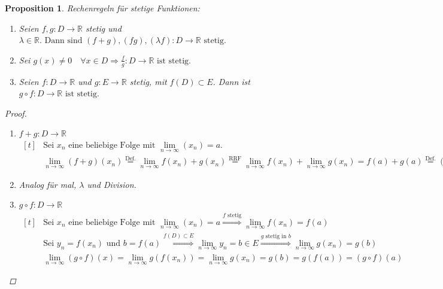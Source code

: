 \documentclass[a4paper,titlepage,oneside]{article}
\def\R{\ensuremath{\mathbb{R}} }
\def\sp{\hspace{0,1cm}}
\renewcommand{\liminf}[2][n]{\ensuremath{\lim\limits_{#1 \rightarrow \infty}{#2}}}
\theoremstyle{thmstyle}
\newtheorem{prop}[satz]{Proposition}
\theoremstyle{subthmstyle}
\begin{document}
\begin{prop}
Rechenregeln für stetige Funktionen:
\begin{enumerate}
\item Seien  $f, g : D \to \R$ stetig und $\lambda \in \R. \text{ Dann sind } (f+g),(fg),(\lambda f) : D \to \R \text{ stetig.}$
\item Sei $\displaystyle g(x) \ne 0 \quad \forall x \in D \Rightarrow \frac{f}{g}: D \to \R \text{ ist stetig.}$
\item Seien \(f: D \to \R\) und \(g:E \to \R\) stetig, mit \(f(D) \subset E\). Dann ist $ g \circ f : D \to \R \text{ ist stetig.}$
\end{enumerate}

\begin{proof}\sp
\begin{enumerate}
\item \(f+g : D \to \R\) \\
\begin{math}\displaystyle \begin{aligned}[t]
&\text{Sei } x_n \text{ eine beliebige Folge mit } \liminf{(x_n)} = a. \\
&\liminf{(f+g)(x_n)} \overset{\text{Def.}}{=} \liminf{f(x_n) + g(x_n)} \overset{\text{RRF}}{=} \liminf{f(x_n)} + \liminf{g(x_n)} = f(a) + g(a) \overset{\text{Def.}}{=} (f+g)(a)
\end{aligned}\end{math} 

\item Analog für mal, \(\lambda\) und Division. %

\item \(g \circ f : D \to \R\)\\
\begin{math}\displaystyle \begin{aligned}[t]
&\text{Sei } x_n \text{ eine beliebige Folge mit } \liminf{(x_n)} = a \overset{f\text{ stetig}}{\Rightarrow} \liminf{f(x_n)} = f(a) \\
&\text{Sei } y_n = f(x_n) \text{ und } b = f(a) \overset{f(D) \subset E}{\Rightarrow}  \liminf{y_n} = b \in E \overset{g \text{ stetig in }b}{\Rightarrow} \liminf{g(x_n)} = g(b) \\
&\liminf{(g \circ f)(x)} = \liminf{g(f(x_n))} = \liminf{g(x_n)} = g(b) = g(f(a)) = (g \circ f)(a)
\end{aligned}\end{math} 
\end{enumerate}
\end{proof}
\end{prop}
\end{document}
